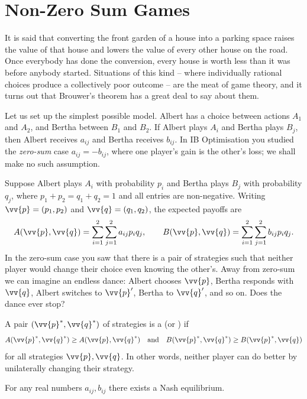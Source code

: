 \section{Non-Zero Sum Games}

It is said that converting the front garden of a house into a parking space raises the value of that house and lowers the value of every other house on the road. Once everybody has done the conversion, every house is worth less than it was before anybody started. Situations of this kind -- where individually rational choices produce a collectively poor outcome -- are the meat of game theory, and it turns out that Brouwer's theorem has a great deal to say about them.

Let us set up the simplest possible model. Albert has a choice between actions $A_1$ and $A_2$, and Bertha between $B_1$ and $B_2$. If Albert plays $A_i$ and Bertha plays $B_j$, then Albert receives $a_{ij}$ and Bertha receives $b_{ij}$. In IB Optimisation you studied the \emph{zero-sum} case $a_{ij} = -b_{ij}$, where one player's gain is the other's loss; we shall make no such assumption.

Suppose Albert plays $A_i$ with probability $p_i$ and Bertha plays $B_j$ with probability $q_j$, where $p_1+p_2 = q_1+q_2 = 1$ and all entries are non-negative. Writing $\vv{p} = (p_1,p_2)$ and $\vv{q} = (q_1,q_2)$, the expected payoffs are
$$A(\vv{p},\vv{q}) = \sum_{i=1}^2\sum_{j=1}^2 a_{ij}p_iq_j, \qquad B(\vv{p},\vv{q}) = \sum_{i=1}^2\sum_{j=1}^2 b_{ij}p_iq_j.$$
In the zero-sum case you saw that there is a pair of strategies such that neither player would change their choice even knowing the other's. Away from zero-sum we can imagine an endless dance: Albert chooses $\vv{p}$, Bertha responds with $\vv{q}$, Albert switches to $\vv{p}'$, Bertha to $\vv{q}'$, and so on. Does the dance ever stop?

\begin{definition}
	A pair $(\vv{p}^*,\vv{q}^*)$ of strategies is a  (or ) if
	$$A(\vv{p}^*,\vv{q}^*) \geq A(\vv{p},\vv{q}^*) \quad\text{and}\quad B(\vv{p}^*,\vv{q}^*)\geq B(\vv{p}^*,\vv{q})$$
	for all strategies $\vv{p},\vv{q}$. In other words, neither player can do better by unilaterally changing their strategy.
\end{definition}

\begin{theorem}[Nash]\label{thm:nash}
	For any real numbers $a_{ij}, b_{ij}$ there exists a Nash equilibrium.
\end{theorem}

